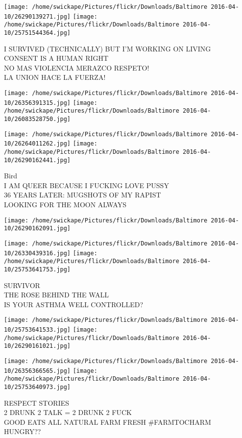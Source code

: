\documentclass[10pt,letterpaper]{article}
\begin{document}
\texttt{[image: /home/swickape/Pictures/flickr/Downloads/Baltimore 2016-04-10/26290139271.jpg]}
\texttt{[image: /home/swickape/Pictures/flickr/Downloads/Baltimore 2016-04-10/25751544364.jpg]}

I SURVIVED (TECHNICALLY) BUT I'M WORKING ON LIVING\\
CONSENT IS A HUMAN RIGHT\\
NO MAS VIOLENCIA MERAZCO RESPETO!\\
LA UNION HACE LA FUERZA!
\pagebreak

\texttt{[image: /home/swickape/Pictures/flickr/Downloads/Baltimore 2016-04-10/26356391315.jpg]}
\texttt{[image: /home/swickape/Pictures/flickr/Downloads/Baltimore 2016-04-10/26083528750.jpg]}

\texttt{[image: /home/swickape/Pictures/flickr/Downloads/Baltimore 2016-04-10/26264011262.jpg]}
\texttt{[image: /home/swickape/Pictures/flickr/Downloads/Baltimore 2016-04-10/26290162441.jpg]}

Bird\\
I AM QUEER BECAUSE I FUCKING LOVE PUSSY\\
36 YEARS LATER: MUGSHOTS OF MY RAPIST\\
LOOKING FOR THE MOON ALWAYS
\pagebreak

\texttt{[image: /home/swickape/Pictures/flickr/Downloads/Baltimore 2016-04-10/26290162091.jpg]}

\vspace{0.25in}
\texttt{[image: /home/swickape/Pictures/flickr/Downloads/Baltimore 2016-04-10/26330439316.jpg]}
\texttt{[image: /home/swickape/Pictures/flickr/Downloads/Baltimore 2016-04-10/25753641753.jpg]}

SURVIVOR\\
THE ROSE BEHIND THE WALL\\
IS YOUR ASTHMA WELL CONTROLLED?
\pagebreak

\texttt{[image: /home/swickape/Pictures/flickr/Downloads/Baltimore 2016-04-10/25753641533.jpg]}
\texttt{[image: /home/swickape/Pictures/flickr/Downloads/Baltimore 2016-04-10/26290161021.jpg]}

\texttt{[image: /home/swickape/Pictures/flickr/Downloads/Baltimore 2016-04-10/26356366565.jpg]}
\texttt{[image: /home/swickape/Pictures/flickr/Downloads/Baltimore 2016-04-10/25753640973.jpg]}

RESPECT STORIES\\
2 DRUNK 2 TALK = 2 DRUNK 2 FUCK\\
GOOD EATS ALL NATURAL FARM FRESH \#FARMTOCHARM\\
HUNGRY??
\pagebreak
\end{document}
